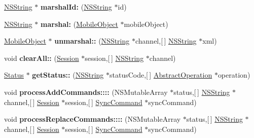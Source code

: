 \begin{DoxyCompactItemize}
\item 
\hypertarget{interface_sync_engine_aecb9436c683f77dec55a262753a8c8fa}{
\hyperlink{class_n_s_string}{\-N\-S\-String} $\ast$ {\bfseries marshal\-Id\-:} (\hyperlink{class_n_s_string}{\-N\-S\-String} $\ast$id)}
\label{interface_sync_engine_aecb9436c683f77dec55a262753a8c8fa}

\item 
\hypertarget{interface_sync_engine_a130a4d1d4fa66dc5903d50206cd76e6d}{
\hyperlink{class_n_s_string}{\-N\-S\-String} $\ast$ {\bfseries marshal\-:} (\hyperlink{interface_mobile_object}{\-Mobile\-Object} $\ast$mobile\-Object)}
\label{interface_sync_engine_a130a4d1d4fa66dc5903d50206cd76e6d}

\item 
\hypertarget{interface_sync_engine_adfd9a58caba17984cf91be19600472e0}{
\hyperlink{interface_mobile_object}{\-Mobile\-Object} $\ast$ {\bfseries unmarshal\-::} (\hyperlink{class_n_s_string}{\-N\-S\-String} $\ast$channel,\mbox{[}$\,$\mbox{]} \hyperlink{class_n_s_string}{\-N\-S\-String} $\ast$xml)}
\label{interface_sync_engine_adfd9a58caba17984cf91be19600472e0}

\item 
\hypertarget{interface_sync_engine_a7b568d278b4bc570363f2ca501ed7249}{
void {\bfseries clear\-All\-::} (\hyperlink{interface_session}{\-Session} $\ast$session,\mbox{[}$\,$\mbox{]} \hyperlink{class_n_s_string}{\-N\-S\-String} $\ast$channel)}
\label{interface_sync_engine_a7b568d278b4bc570363f2ca501ed7249}

\item 
\hypertarget{interface_sync_engine_a1bb476b1da5d75446d5e5a473c87a214}{
\hyperlink{interface_status}{\-Status} $\ast$ {\bfseries get\-Status\-::} (\hyperlink{class_n_s_string}{\-N\-S\-String} $\ast$status\-Code,\mbox{[}$\,$\mbox{]} \hyperlink{interface_abstract_operation}{\-Abstract\-Operation} $\ast$operation)}
\label{interface_sync_engine_a1bb476b1da5d75446d5e5a473c87a214}

\item 
\hypertarget{interface_sync_engine_ae3461606440d1c189a7fc56b02047aec}{
void {\bfseries process\-Add\-Commands\-::::} (\-N\-S\-Mutable\-Array $\ast$status,\mbox{[}$\,$\mbox{]} \hyperlink{class_n_s_string}{\-N\-S\-String} $\ast$channel,\mbox{[}$\,$\mbox{]} \hyperlink{interface_session}{\-Session} $\ast$session,\mbox{[}$\,$\mbox{]} \hyperlink{interface_sync_command}{\-Sync\-Command} $\ast$sync\-Command)}
\label{interface_sync_engine_ae3461606440d1c189a7fc56b02047aec}

\item 
\hypertarget{interface_sync_engine_a890c76e116a39f63594f5d29273a54f8}{
void {\bfseries process\-Replace\-Commands\-::::} (\-N\-S\-Mutable\-Array $\ast$status,\mbox{[}$\,$\mbox{]} \hyperlink{class_n_s_string}{\-N\-S\-String} $\ast$channel,\mbox{[}$\,$\mbox{]} \hyperlink{interface_session}{\-Session} $\ast$session,\mbox{[}$\,$\mbox{]} \hyperlink{interface_sync_command}{\-Sync\-Command} $\ast$sync\-Command)}
\label{interface_sync_engine_a890c76e116a39f63594f5d29273a54f8}


\end{DoxyCompactItemize}
